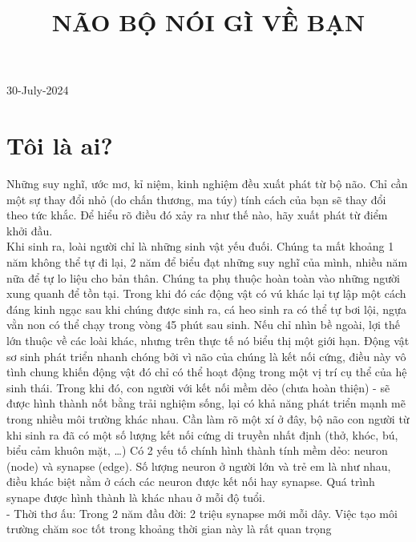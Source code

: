 \documentclass{article}
\title{NÃO BỘ NÓI GÌ VỀ BẠN}
\newcommand\tab[1][1cm]{\hspace*{#1}}
\begin{document}
\maketitle

30-July-2024
\section{Tôi là ai?}

\tab Những suy nghĩ, ước mơ, kỉ niệm, kinh nghiệm đều xuất phát từ bộ não. Chỉ cần một sự thay đổi nhỏ (do chấn thương, ma túy) tính cách của bạn sẽ thay đổi theo tức khắc. Để hiểu rõ điều đó xảy ra như thế nào, hãy xuất phát từ điểm khởi đầu.\\
\tab Khi sinh ra, loài người chỉ là những sinh vật yếu đuối. Chúng ta mất khoảng 1 năm không thể tự đi lại, 2 năm để biểu đạt những suy nghĩ của mình, nhiều năm nữa để tự lo liệu cho bản thân. Chúng ta phụ thuộc hoàn toàn vào những người xung quanh để tồn tại. Trong khi đó các động vật có vú khác lại tự lập một cách đáng kinh ngạc sau khi chúng được sinh ra, cá heo sinh ra có thể tự bơi lội, ngựa vằn non có thể chạy trong vòng 45 phút sau sinh. Nếu chỉ nhìn bề ngoài, lợi thế lớn thuộc về các loài khác, nhưng trên thực tế nó biểu thị một giới hạn. Động vật sơ sinh phát triển nhanh chóng bởi vì não của chúng là kết nối cứng, điều này vô tình chung khiến động vật đó chỉ có thể hoạt động trong một vị trí cụ thể của hệ sinh thái. Trong khi đó, con người với kết nối mềm dẻo (chưa hoàn thiện) - sẽ được hình thành nốt bằng trải nghiệm sống, lại có khả năng phát triển mạnh mẽ trong nhiều môi trường khác nhau. Cần làm rõ một xí ở đây, bộ não con người từ khi sinh ra đã có một số lượng kết nối cứng di truyền nhất định (thở, khóc, bú, biểu cảm khuôn mặt, \dots)
\tab Có 2 yếu tố chính hình thành tính mềm dẻo: neuron (node) và synapse (edge). Số lượng neuron ở người lớn và trẻ em là như nhau, điều khác biệt nằm ở cách các neuron được kết nối hay synapse. Quá trình synape được hình thành là khác nhau ở mỗi độ tuổi.\\
\tab\tab - Thời thơ ấu: Trong 2 năm đầu đời: 2 triệu synapse mới mỗi dây. Việc tạo môi trường chăm soc tốt trong khoảng thời gian này là rất quan trọng \\
\end{document}
